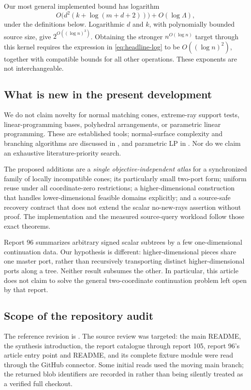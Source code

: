 Our most general implemented bound has logarithm
\begin{equation}
 O\bigl(d^2(k+\log(m+d+2))\bigr)+O(\log\Lambda),
 \label{eq:headline-log}
\end{equation}
under the definitions below. Logarithmic $d$ and $k$, with polynomially bounded source size, give $2^{O((\log n)^3)}$. Obtaining the stronger $n^{O(\log n)}$ target through this kernel requires the expression in \eqref{eq:headline-log} to be $O((\log n)^2)$, together with compatible bounds for all other operations. These exponents are not interchangeable.

\subsection{What is new in the present development}
We do not claim novelty for normal matching cones, extreme-ray support tests, linear-programming bases, polyhedral arrangements, or parametric linear programming. These are established tools; normal-surface complexity and branching algorithms are discussed in \cite{bo,bps}, and parametric LP in \cite{parametric}. Nor do we claim an exhaustive literature-priority search.

The proposed additions are a \emph{single objective-independent atlas} for a synchronized family of locally incompatible cones; its particularly small two-port form; uniform reuse under all coordinate-zero restrictions; a higher-dimensional construction that handles lower-dimensional feasible domains explicitly; and a source-safe recovery contract that does not extend the scalar no-new-rays assertion without proof. The implementation and the measured source-query workload follow those exact theorems.

Report 96 summarizes arbitrary signed scalar subtrees by a few one-dimensional continuation data. Our hypothesis is different: higher-dimensional pieces share one master port, rather than recursively transporting distinct higher-dimensional ports along a tree. Neither result subsumes the other. In particular, this article does not claim to solve the general two-coordinate continuation problem left open by that report.

\subsection{Scope of the repository audit}
The reference revision is \pin. The source review was targeted: the main README, the synthesis introduction, the report catalogue through report 105, report 96's article entry point and README, and its complete fixture module were read through the GitHub connector. Some initial reads used the moving main branch; the returned blob identifiers are recorded in  rather than being silently treated as a verified full checkout.

